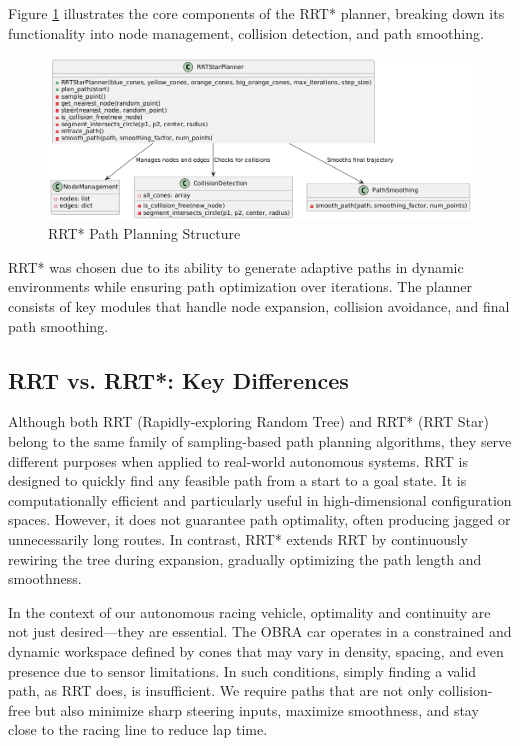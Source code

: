 \documentclass[a4paper,11pt]{report}
\begin{document}
Figure \ref{fig:rrtstar_structure} illustrates the core components of the RRT* planner, breaking down its functionality into node management, collision detection, and path smoothing.

\begin{figure}[h]
    \centering
    \includegraphics[width=\textwidth]{Images/rrt.png}
    \caption{RRT* Path Planning Structure}
    \label{fig:rrtstar_structure}
\end{figure}

RRT* was chosen due to its ability to generate adaptive paths in dynamic environments while ensuring path optimization over iterations. The planner consists of key modules that handle node expansion, collision avoidance, and final path smoothing.

\subsection{RRT vs. RRT*: Key Differences}

Although both RRT (Rapidly-exploring Random Tree) and RRT* (RRT Star) belong to the same family of sampling-based path planning algorithms, they serve different purposes when applied to real-world autonomous systems. RRT is designed to quickly find any feasible path from a start to a goal state. It is computationally efficient and particularly useful in high-dimensional configuration spaces. However, it does not guarantee path optimality, often producing jagged or unnecessarily long routes. In contrast, RRT* extends RRT by continuously rewiring the tree during expansion, gradually optimizing the path length and smoothness.

In the context of our autonomous racing vehicle, optimality and continuity are not just desired—they are essential. The OBRA car operates in a constrained and dynamic workspace defined by cones that may vary in density, spacing, and even presence due to sensor limitations. In such conditions, simply finding a valid path, as RRT does, is insufficient. We require paths that are not only collision-free but also minimize sharp steering inputs, maximize smoothness, and stay close to the racing line to reduce lap time.
\end{document}
